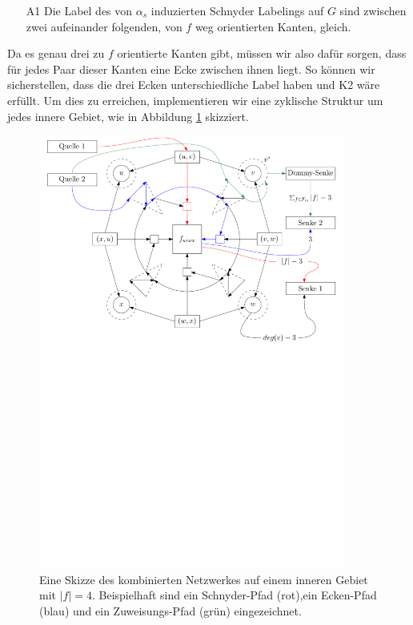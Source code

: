 \begin{itemize}
\item [A1] Die Label des von $\alpha_s$ induzierten Schnyder Labelings auf $G$ sind zwischen zwei aufeinander folgenden, von $f$ weg orientierten Kanten, gleich.
\end{itemize}

Da es genau drei zu $f$ orientierte Kanten gibt, müssen wir also dafür sorgen, dass für jedes Paar dieser Kanten eine Ecke zwischen ihnen liegt. So können wir sicherstellen, dass die drei Ecken unterschiedliche Label haben und K2 wäre erfüllt. Um dies zu erreichen, implementieren wir eine zyklische Struktur um jedes innere Gebiet, wie in Abbildung \ref{combined_face_sketch} skizziert.

\begin{figure}[h]
	\centering
  	\includegraphics[width=0.9\textwidth]{combined_face_sketch.pdf}
  	\caption{Eine Skizze des kombinierten Netzwerkes auf einem inneren Gebiet mit $|f| = 4$. Beispielhaft sind ein Schnyder-Pfad (rot),ein Ecken-Pfad (blau) und ein Zuweisungs-Pfad (grün) eingezeichnet. }
	\label{combined_face_sketch}
\end{figure}

